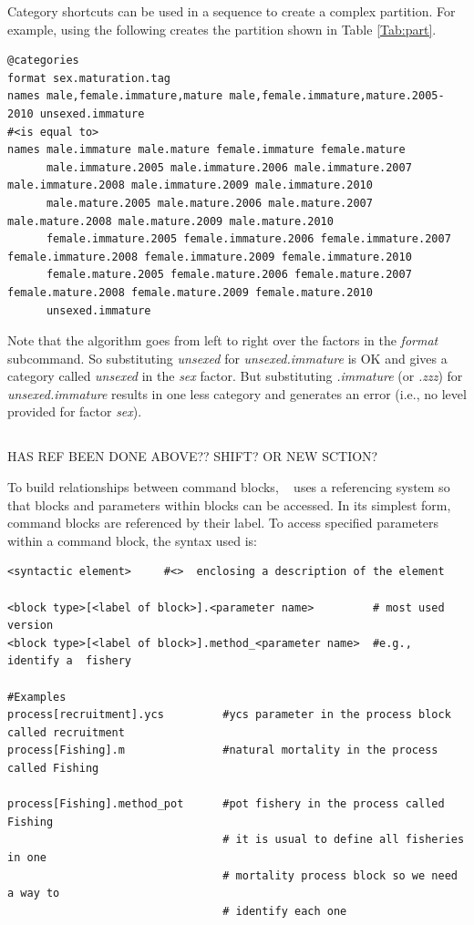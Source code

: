Category shortcuts can be used in a sequence to create a complex partition. For example, using the following creates the partition shown in Table \ref{Tab:part}.
{\small{\begin{lstlisting}
@categories
format sex.maturation.tag
names male,female.immature,mature male,female.immature,mature.2005-2010 unsexed.immature 
#<is equal to>
names male.immature male.mature female.immature female.mature
      male.immature.2005 male.immature.2006 male.immature.2007 male.immature.2008 male.immature.2009 male.immature.2010
      male.mature.2005 male.mature.2006 male.mature.2007 male.mature.2008 male.mature.2009 male.mature.2010
      female.immature.2005 female.immature.2006 female.immature.2007 female.immature.2008 female.immature.2009 female.immature.2010
      female.mature.2005 female.mature.2006 female.mature.2007 female.mature.2008 female.mature.2009 female.mature.2010      
      unsexed.immature
\end{lstlisting}}}

Note that the algorithm goes from left to right over the factors in the \textit{format} subcommand. So substituting \textit{unsexed} for \textit{unsexed.immature} is OK and gives a category called \textit{unsexed} in the \textit{sex} factor. But substituting \textit{.immature} (or \textit{.zzz}) for \textit{unsexed.immature} results in one less category and generates an error (i.e., no level provided for factor \textit{sex}).

\subsection{\label{sec:params}}

HAS REF BEEN DONE ABOVE?? SHIFT? OR NEW SCTION?

To build relationships between command blocks, \CNAME~ uses  a referencing system so that blocks and parameters within blocks can be accessed. In its simplest form, command blocks are referenced by their label. To access specified parameters within a command block,  the syntax used is:

{\small{\begin{verbatim}
<syntactic element>     #<>  enclosing a description of the element

<block type>[<label of block>].<parameter name>         # most used version
<block type>[<label of block>].method_<parameter name>  #e.g., identify a  fishery

#Examples
process[recruitment].ycs         #ycs parameter in the process block called recruitment
process[Fishing].m               #natural mortality in the process called Fishing

process[Fishing].method_pot      #pot fishery in the process called Fishing
                                 # it is usual to define all fisheries in one 
                                 # mortality process block so we need a way to
                                 # identify each one
\end{verbatim}}}




